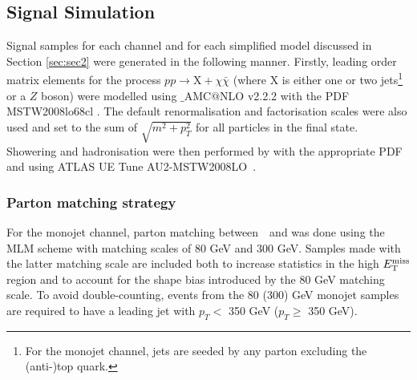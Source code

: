 \subsection{Signal Simulation}
\label{signal_generation}
Signal samples for each channel and for each simplified model discussed in Section \ref{sec:sec2} were generated in the following manner. Firstly, leading order matrix elements for the process $pp \rightarrow \mathrm{X} + \chi\bar{\chi}$ (where X is either one or two jets\footnote{For the monojet channel, jets are seeded by any parton excluding the (anti-)top quark.} or a $Z$ boson) were modelled using \MG$\_${\footnotesize A}MC$@$NLO v2.2.2 \cite{MG_aMCNLO2014} with the PDF MSTW2008lo68cl \cite{MSTW}. The default renormalisation and factorisation scales were also used and set to the sum of $\sqrt{m^{2} + p_{T}^{2}}$ for all particles in the final state. Showering and hadronisation were then performed by  with the appropriate PDF and using ATLAS UE Tune AU2-MSTW2008LO~\cite{AUtune}.

{}

 
\subsubsection{Parton matching strategy}
For the monojet channel, parton matching between \MG$\mbox{ }$and \PYTHIA was done using the MLM scheme with matching scales of 80 GeV and 300 GeV. Samples made with the latter matching scale are included both to increase statistics in the high $E_{\mathrm{T}}^{\mathrm{miss}}$ region and to account for the shape bias introduced by the 80 GeV matching scale. To avoid double-counting, events from the 80 (300) GeV monojet samples are required to have a leading jet with $p_{T} <$ 350 GeV ($p_{T} \geq$ 350 GeV).


